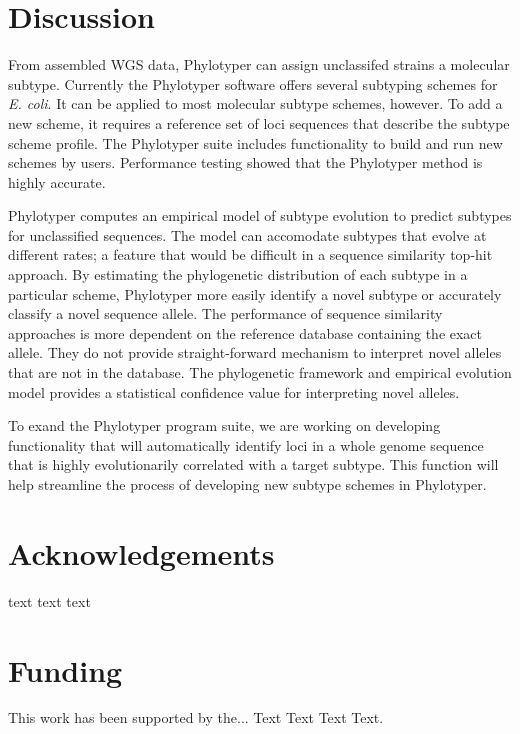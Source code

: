 \documentclass{bioinfo}
\begin{document}
\section{Discussion}

From assembled WGS data, Phylotyper can assign unclassifed strains a molecular subtype.
Currently the Phylotyper software offers several subtyping schemes for \textit{E. coli}.
It can be applied to most molecular subtype schemes, however.
To add a new scheme, it requires a reference set of loci sequences that describe the subtype scheme profile.
The Phylotyper suite includes functionality to build and run new schemes by users.
Performance testing showed that the Phylotyper method is highly accurate.

Phylotyper computes an empirical model of subtype evolution to predict subtypes for unclassified sequences. 
The model can accomodate subtypes that evolve at different rates; a feature that would be difficult in a sequence similarity top-hit approach. 
By estimating the phylogenetic distribution of each subtype in a particular scheme, Phylotyper more easily identify a novel subtype or accurately classify a novel sequence allele.
The performance of sequence similarity approaches is more dependent on the reference database containing the exact allele.  
They do not provide straight-forward mechanism to interpret novel alleles that are not in the database.
The phylogenetic framework and empirical evolution model provides a statistical confidence value for interpreting novel alleles.

To exand the Phylotyper program suite, we are working on developing functionality that will automatically identify loci in a whole genome sequence that is highly evolutionarily correlated with a target subtype.  This function will help streamline the process of developing new subtype schemes in Phylotyper.\vspace*{-10pt}


\section*{Acknowledgements}

text text text\vspace*{-12pt}

\section*{Funding}

This work has been supported by the... Text Text  Text Text.\vspace*{-12pt}


% 
%
% 
%

%


\end{document}
